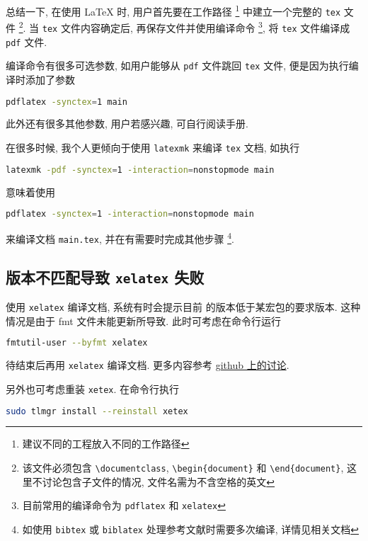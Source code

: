 总结一下, 在使用 \LaTeX{} 时, 用户首先要在工作路径%
\footnote{建议不同的工程放入不同的工作路径}%
中建立一个完整的 \texttt{tex} 文件%
\footnote{该文件必须包含 \texttt{\textbackslash documentclass},
\texttt{\textbackslash begin\{document\}} 和
\texttt{\textbackslash end\{document\}},
这里不讨论包含子文件的情况,
文件名需为不含空格的英文}.
当 \texttt{tex} 文件内容确定后, 再保存文件并使用编译命令%
\footnote{目前常用的编译命令为 \texttt{pdflatex} 和 \texttt{xelatex}},
将 \texttt{tex} 文件编译成 \texttt{pdf} 文件. 

编译命令有很多可选参数, 如用户能够从 \texttt{pdf} 文件跳回 \texttt{tex} 文件,
便是因为执行编译时添加了参数
\begin{lstlisting}[language=bash]
  pdflatex -synctex=1 main
\end{lstlisting}
此外还有很多其他参数, 用户若感兴趣, 可自行阅读手册. 

在很多时候, 我个人更倾向于使用 \texttt{latexmk} 来编译 \texttt{tex} 文档,
如执行
\begin{lstlisting}[language=bash]
  latexmk -pdf -synctex=1 -interaction=nonstopmode main
\end{lstlisting}
意味着使用 
\begin{lstlisting}[language=bash]
  pdflatex -synctex=1 -interaction=nonstopmode main
\end{lstlisting}
来编译文档 \texttt{main.tex}, 并在有需要时完成其他步骤%
\footnote{如使用 \texttt{bibtex} 或 \texttt{biblatex} 处理参考文献时需要多次编译,
详情见相关文档}. 

\subsection{\LaTeXe 版本不匹配导致 \texttt{xelatex} 失败}

使用 \texttt{xelatex} 编译文档,
系统有时会提示目前 \LaTeXe 的版本低于某宏包的要求版本.
这种情况是由于 \textsf{fmt} 文件未能更新所导致.
此时可考虑在命令行运行
\begin{lstlisting}[language=bash]
  fmtutil-user --byfmt xelatex
\end{lstlisting}
待结束后再用 \texttt{xelatex} 编译文档.
更多内容参考
\href{https://github.com/CTeX-org/forum/issues/70}{github 上的讨论}.

另外也可考虑重装 \texttt{xetex}.
在命令行执行
\begin{lstlisting}[language=bash]
  sudo tlmgr install --reinstall xetex
\end{lstlisting}
